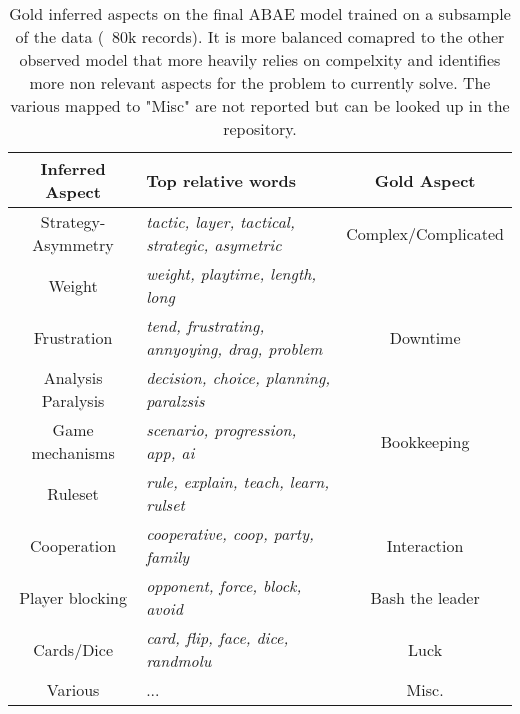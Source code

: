 \begin{center}
    \begin{table}
        \begin{tabular}{c l c}
            \hline
            Inferred Aspect    & Top relative words                                     & Gold Aspect \\ [0.5ex]
            \hline\hline
            Strategy-Asymmetry & \textit{tactic, layer, tactical, strategic, asymetric} & Complex/Complicated \\
            Weight             & \textit{weight, playtime, length, long}                &                     \\
            \hline
            Frustration        & \textit{tend, frustrating, annyoying, drag, problem}   & Downtime            \\
            Analysis Paralysis & \textit{decision, choice, planning, paralzsis}         &                     \\
            \hline
            Game mechanisms    & \textit{scenario, progression, app, ai}                & Bookkeeping         \\
            Ruleset            & \textit{rule, explain, teach, learn, rulset}           &                     \\
            \hline
            Cooperation        & \textit{cooperative, coop, party, family}              & Interaction         \\
            \hline
            Player blocking    & \textit{opponent, force, block, avoid}                 & Bash the leader     \\
            \hline
            Cards/Dice         & \textit{card, flip, face, dice, randmolu}              & Luck                \\
            \hline
            Various            & ...                                                    & Misc.               \\
            \hline
        \end{tabular}
        \caption{Gold inferred aspects on the final ABAE model trained on a subsample of the data (~80k records).
        It is more balanced comapred to the other observed model that more heavily relies on compelxity and identifies
        more non relevant aspects for the problem to currently solve.
        The various mapped to "Misc" are not reported but can be looked up in the repository.
        }
        \label{best-80}
    \end{table}

\end{center}



